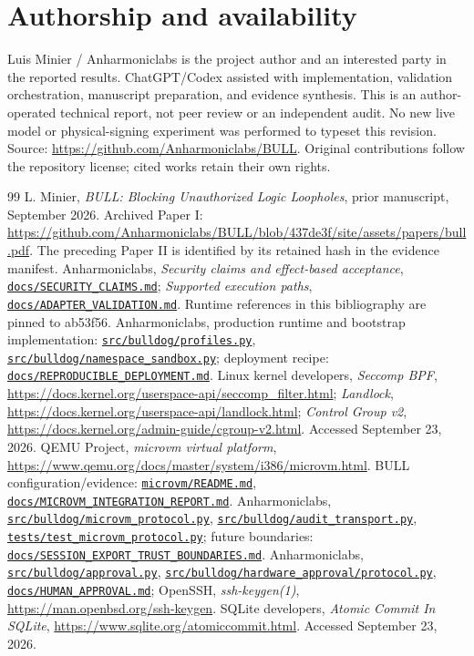 \documentclass[journal]{IEEEtran}
\newcommand{\repo}[1]{\href{https://github.com/Anharmoniclabs/BULL/blob/ab53f563bcbcaf60820acb318b8212796ce502ff/#1}{\nolinkurl{#1}}}
\begin{document}
\section*{Authorship and availability}
Luis Minier / Anharmoniclabs is the project author and an interested party in the reported results. ChatGPT/Codex assisted with implementation, validation orchestration, manuscript preparation, and evidence synthesis. This is an author-operated technical report, not peer review or an independent audit. No new live model or physical-signing experiment was performed to typeset this revision. Source: \url{https://github.com/Anharmoniclabs/BULL}. Original contributions follow the repository license; cited works retain their own rights.

\begin{thebibliography}{99}\small
{} L. Minier, \emph{BULL: Blocking Unauthorized Logic Loopholes}, prior manuscript, September 2026. Archived Paper I: \url{https://github.com/Anharmoniclabs/BULL/blob/437de3f/site/assets/papers/bull.pdf}. The preceding Paper II is identified by its retained hash in the evidence manifest.
 Anharmoniclabs, \emph{Security claims and effect-based acceptance}, \repo{docs/SECURITY_CLAIMS.md}; \emph{Supported execution paths}, \repo{docs/ADAPTER_VALIDATION.md}. Runtime references in this bibliography are pinned to ab53f56.
 Anharmoniclabs, production runtime and bootstrap implementation: \repo{src/bulldog/profiles.py}, \repo{src/bulldog/namespace_sandbox.py}; deployment recipe: \repo{docs/REPRODUCIBLE_DEPLOYMENT.md}.
 Linux kernel developers, \emph{Seccomp BPF}, \url{https://docs.kernel.org/userspace-api/seccomp_filter.html}; \emph{Landlock}, \url{https://docs.kernel.org/userspace-api/landlock.html}; \emph{Control Group v2}, \url{https://docs.kernel.org/admin-guide/cgroup-v2.html}. Accessed September 23, 2026.
 QEMU Project, \emph{microvm virtual platform}, \url{https://www.qemu.org/docs/master/system/i386/microvm.html}. BULL configuration/evidence: \repo{microvm/README.md}, \repo{docs/MICROVM_INTEGRATION_REPORT.md}.
 Anharmoniclabs, \repo{src/bulldog/microvm_protocol.py}, \repo{src/bulldog/audit_transport.py}, \repo{tests/test_microvm_protocol.py}; future boundaries: \repo{docs/SESSION_EXPORT_TRUST_BOUNDARIES.md}.
 Anharmoniclabs, \repo{src/bulldog/approval.py}, \repo{src/bulldog/hardware_approval/protocol.py}, \repo{docs/HUMAN_APPROVAL.md}; OpenSSH, \emph{ssh-keygen(1)}, \url{https://man.openbsd.org/ssh-keygen}.
 SQLite developers, \emph{Atomic Commit In SQLite}, \url{https://www.sqlite.org/atomiccommit.html}. Accessed September 23, 2026.

\end{thebibliography}
\end{document}
